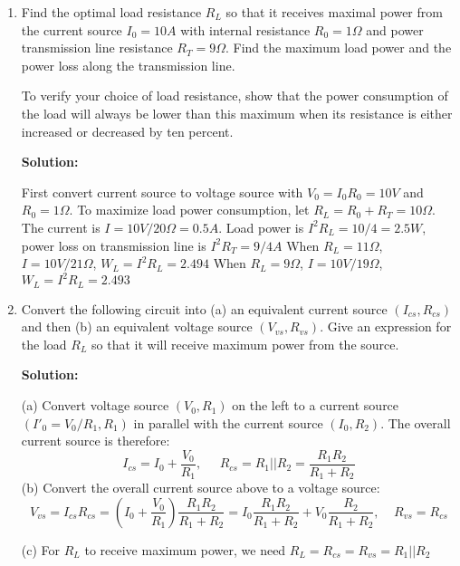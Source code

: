 \begin{enumerate}
\item Find the optimal load resistance $R_L$ so that it receives maximal
power from the current source $I_0=10A$ with internal resistance 
$R_0=1\Omega$ and power transmission line resistance $R_T=9\Omega$. 
Find the maximum load power and the power loss along the transmission 
line.


To verify your choice of load resistance, show that the power consumption
of the load will always be lower than this maximum when its resistance is 
either increased or decreased by ten percent.

{\bf Solution:}

 First convert current source to voltage source with $V_0=I_0 R_0=10V$
 and $R_0=1 \Omega$. To maximize load power consumption, let 
 $R_L=R_0+R_T=10 \Omega$. The current is $I=10V/20\Omega=0.5A$. Load power 
 is $I^2R_L=10/4=2.5W$, power loss on transmission line is $I^2R_T=9/4A$
 When $R_L=11\Omega$, $I=10V/21\Omega$, $W_L=I^2 R_L=2.494$
 When $R_L=9\Omega$, $I=10V/19\Omega$, $W_L=I^2 R_L=2.493$

\item Convert the following circuit into (a) an equivalent current 
  source $(I_{cs}, R_{cs})$ and then (b) an equivalent voltage source
  $(V_{vs}, R_{vs})$. Give an expression for the load $R_L$ so that it 
  will receive maximum power from the source.


{\bf Solution:}

(a) Convert voltage source $(V_0,R_1)$ on the left to a current source
    $(I'_0=V_0/R_1, R_1)$ in parallel with the current source $(I_0,R_2)$.
    The overall current source is therefore:
\[ I_{cs}=I_0+\frac{V_0}{R_1},\;\;\;\;\;
   R_{cs}=R_1||R_2=\frac{R_1 R_2}{R_1+R_2} \]
(b) Convert the overall current source above to a voltage source:
\[ V_{vs}=I_{cs} R_{cs}=(I_0+\frac{V_0}{R_1})\frac{R_1 R_2}{R_1+R_2} 
   =I_0\frac{R_1 R_2}{R_1+R_2}+V_0\frac{R_2}{R_1+R_2},\;\;\;\;
   R_{vs}=R_{cs}
\]

(c) For $R_L$ to receive maximum power, we need $R_L=R_{cs}=R_{vs}=R_1||R_2$
   


\end{enumerate}



